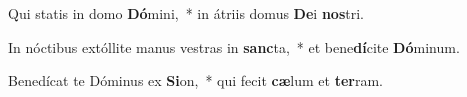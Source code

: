 \item Qui statis in domo \textbf{Dó}mini,~* in átriis domus \textbf{De}i \textbf{nos}tri.
\item In nóctibus extóllite manus vestras in \textbf{sanc}ta,~* et bene\textbf{dí}cite \textbf{Dó}minum.
\item Benedícat te Dóminus ex \textbf{Si}on,~* qui fecit \textbf{cæ}lum et \textbf{ter}ram.
